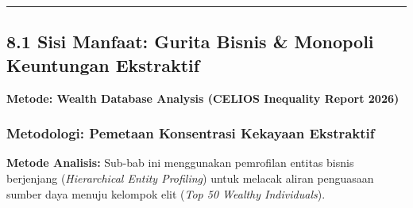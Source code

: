 \documentclass[
]{article}
\begin{document}
\begin{center}\rule{0.5\linewidth}{0.5pt}\end{center}

\subsection{8.1 Sisi Manfaat: Gurita Bisnis \& Monopoli Keuntungan
Ekstraktif}\label{sisi-manfaat-gurita-bisnis-monopoli-keuntungan-ekstraktif}

\textbf{Metode: Wealth Database Analysis (CELIOS Inequality Report
2026)}

\subsubsection{Metodologi: Pemetaan Konsentrasi Kekayaan
Ekstraktif}\label{metodologi-pemetaan-konsentrasi-kekayaan-ekstraktif}

\textbf{Metode Analisis:} Sub-bab ini menggunakan pemrofilan entitas
bisnis berjenjang (\emph{Hierarchical Entity Profiling}) untuk melacak
aliran penguasaan sumber daya menuju kelompok elit (\emph{Top 50 Wealthy
Individuals}).
\end{document}
